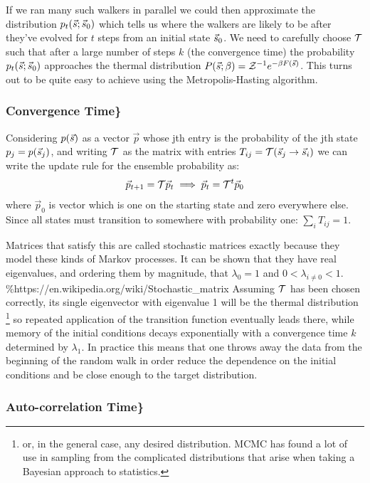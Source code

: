 If we ran many such walkers in parallel we could then approximate the
distribution \(p_t(\vec{s}; \vec{s}_0)\) which tells us where the walkers are
likely to be after they've evolved for \(t\) steps from an initial state
\(\vec{s}_0\). We need to carefully choose \(\mathcal{T}\) such that after a large
number of steps \(k\) (the convergence time) the probability
\(p_t(\vec{s};\vec{s}_0)\) approaches the thermal distribution
\(P(\vec{s}; \beta) = \mathcal{Z}^{-1} e^{-\beta F(\vec{s})}\). This turns out to be quite
easy to achieve using the Metropolis-Hasting algorithm.

\hypertarget{convergence-time}{%
\subsubsection{Convergence Time\}}\label{convergence-time}}

Considering \(p(\vec{s})\) as a vector \(\vec{p}\) whose jth entry is the
probability of the jth state \(p_j = p(\vec{s}_j)\), and writing \(\mathcal{T}\) as
the matrix with entries \(T_{ij} = \mathcal{T}(\vec{s}_j \rightarrow \vec{s}_i)\) we can
write the update rule for the ensemble probability as:
\[\vec{p}_{t+1} = \mathcal{T} \vec{p}_t \implies \vec{p}_{t} = \mathcal{T}^t \vec{p}_0\]
where \(\vec{p}_0\) is vector which is one on the starting state and
zero everywhere else. Since all states must transition to somewhere with
probability one: \(\sum_i T_{ij} = 1\).

Matrices that satisfy this are called stochastic matrices exactly
because they model these kinds of Markov processes. It can be shown that
they have real eigenvalues, and ordering them by magnitude, that
\(\lambda_0 = 1\) and \(0 < \lambda_{i\neq0} < 1\).
\%https://en.wikipedia.org/wiki/Stochastic\_matrix Assuming \(\mathcal{T}\) has
been chosen correctly, its single eigenvector with eigenvalue 1 will be
the thermal distribution
\footnote{or, in the general case, any desired distribution. MCMC has found a lot of use in sampling from the complicated distributions that arise when taking a Bayesian approach to statistics.}
so repeated application of the transition function eventually leads
there, while memory of the initial conditions decays exponentially with
a convergence time \(k\) determined by \(\lambda_1\). In practice this
means that one throws away the data from the beginning of the random
walk in order reduce the dependence on the initial conditions and be
close enough to the target distribution.

\hypertarget{auto-correlation-time}{%
\subsubsection{Auto-correlation Time\}}\label{auto-correlation-time}}

